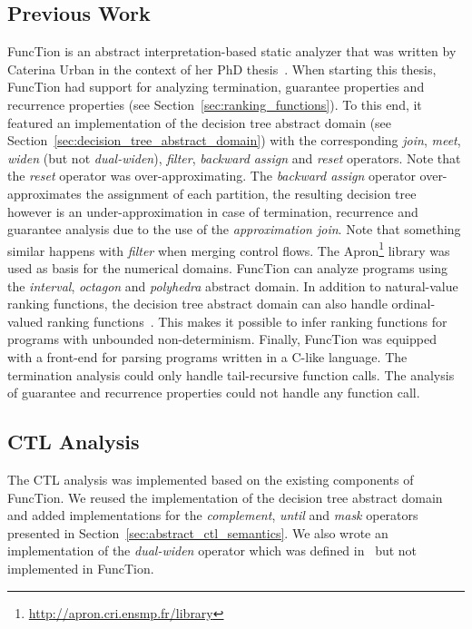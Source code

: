 \documentclass[11pt,a4paper,titlepage]{article}
\theoremstyle{definition}
\begin{document}
\subsection{Previous Work}
FuncTion is an abstract interpretation-based static analyzer that was written by Caterina Urban 
in the context of her PhD thesis~\cite{UrbanPhd}. 
When starting this thesis, FuncTion had support  for analyzing termination, guarantee properties and
recurrence properties (see Section~\ref{sec:ranking_functions}). To this end, it featured an implementation of 
the decision tree abstract domain (see Section~\ref{sec:decision_tree_abstract_domain}) with the corresponding \textit{join}, \textit{meet}, 
\textit{widen} (but not \textit{dual-widen}), \textit{filter}, \textit{backward assign} and \textit{reset} operators.
Note that the \textit{reset} operator was over-approximating. The \textit{backward assign}
operator over-approximates the assignment of each partition, the resulting decision tree however is an under-approximation 
in case of termination, recurrence and guarantee analysis due to the use of the \textit{approximation join}.
Note that something similar happens with \textit{filter} when merging control flows.
The Apron\footnote{\url{http://apron.cri.ensmp.fr/library}} library was used as basis for the numerical domains. 
FuncTion can analyze programs using the \textit{interval}, \textit{octagon} and \textit{polyhedra} abstract domain.
In addition to natural-value ranking functions, the decision tree abstract domain 
can also handle ordinal-valued ranking functions~\cite{UrbanM-ESOP14}. 
This makes it possible to infer ranking functions for programs with unbounded non-determinism.
Finally, FuncTion was equipped with a front-end for parsing programs written in a C-like language. 
The termination analysis could only handle tail-recursive function calls. 
The analysis of guarantee and recurrence properties could not handle any function call.

\subsection{CTL Analysis}

The CTL analysis was implemented based on the existing components of FuncTion. We reused the implementation of the decision tree abstract domain
and added implementations for the \textit{complement}, \textit{until} and \textit{mask} operators presented in Section~\ref{sec:abstract_ctl_semantics}.
We also wrote an implementation of the \textit{dual-widen} operator which was defined in~\cite{UrbanPhd} but not implemented in FuncTion.\\
\end{document}

